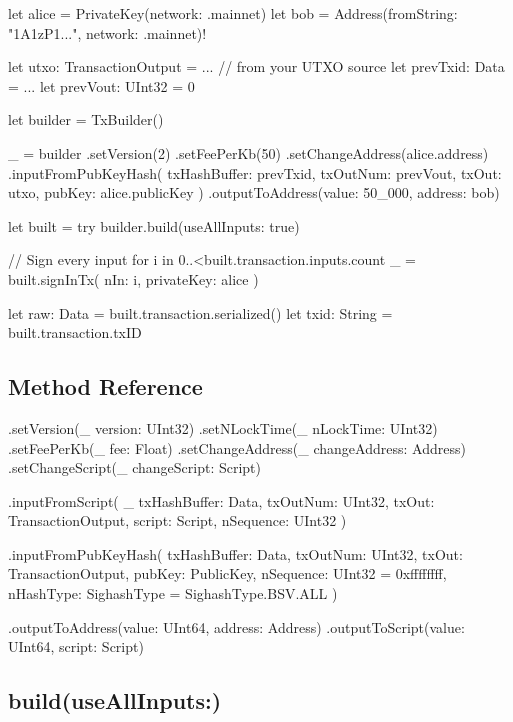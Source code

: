 \documentclass[a4paper, 11pt, openany]{book}
\begin{document}
\begin{forthbox}
let alice = PrivateKey(network: .mainnet)
let bob   = Address(fromString: "1A1zP1...", network: .mainnet)!

let utxo: TransactionOutput = ...   // from your UTXO source
let prevTxid: Data           = ...
let prevVout: UInt32         = 0

let builder = TxBuilder()

_ = builder
    .setVersion(2)
    .setFeePerKb(50)
    .setChangeAddress(alice.address)
    .inputFromPubKeyHash(
        txHashBuffer: prevTxid,
        txOutNum: prevVout,
        txOut: utxo,
        pubKey: alice.publicKey
    )
    .outputToAddress(value: 50_000, address: bob)

let built = try builder.build(useAllInputs: true)

// Sign every input
for i in 0..<built.transaction.inputs.count {
    _ = built.signInTx(
        nIn: i,
        privateKey: alice
    )
}

let raw: Data = built.transaction.serialized()
let txid: String = built.transaction.txID
\end{forthbox}

\subsection{Method Reference}

\begin{forthbox}
.setVersion(_ version: UInt32)
.setNLockTime(_ nLockTime: UInt32)
.setFeePerKb(_ fee: Float)
.setChangeAddress(_ changeAddress: Address)
.setChangeScript(_ changeScript: Script)

.inputFromScript(
    _ txHashBuffer: Data,
    txOutNum: UInt32,
    txOut: TransactionOutput,
    script: Script,
    nSequence: UInt32
)

.inputFromPubKeyHash(
    txHashBuffer: Data,
    txOutNum: UInt32,
    txOut: TransactionOutput,
    pubKey: PublicKey,
    nSequence: UInt32 = 0xffffffff,
    nHashType: SighashType = SighashType.BSV.ALL
)

.outputToAddress(value: UInt64, address: Address)
.outputToScript(value: UInt64, script: Script)
\end{forthbox}

\subsection{build(useAllInputs:)}
\end{document}
